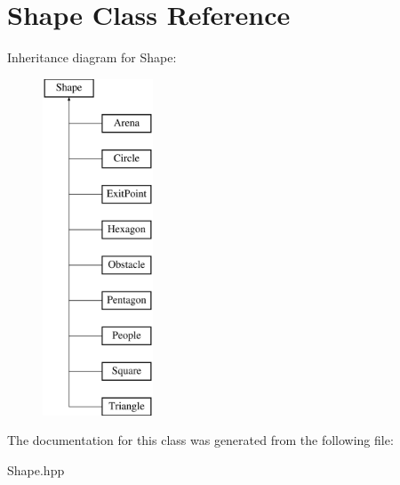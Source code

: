 \hypertarget{class_shape}{}\section{Shape Class Reference}
\label{class_shape}
Inheritance diagram for Shape\+:\begin{figure}[H]
\begin{center}
\leavevmode
\includegraphics[height=10.000000cm]{class_shape}
\end{center}
\end{figure}


The documentation for this class was generated from the following file\+:\begin{DoxyCompactItemize}
\item 
Shape.\+hpp\end{DoxyCompactItemize}
